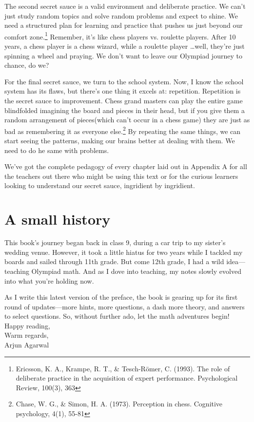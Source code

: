 The second secret sauce is a valid environment and deliberate practice. We can't just study random topics and solve random problems and expect to shine. 
We need a structured plan for learning and practice that pushes us just beyond our comfort zone.\footnote{Ericsson, K. A., Krampe, R. T., \& Tesch-Römer, C. (1993). The role of deliberate practice in the acquisition of expert performance. Psychological Review, 100(3), 363} Remember, it's like chess players vs. roulette players. 
After 10 years, a chess player is a chess wizard, while a roulette player \ldots well, they're just spinning a wheel and praying. 
We don't want to leave our Olympiad journey to chance, do we? \par \medskip
For the final secret sauce, we turn to the school system. 
Now, I know the school system has its flaws, but there's one thing it excels at: repetition. Repetition is the secret sauce to improvement. 
Chess grand masters can play the entire game blindfolded imagining the board and pieces in their head, but if you give them a random arrangement of pieces(which can't occur in a chess game) they are just as bad as remembering it as everyone else.\footnote{Chase, W. G., \& Simon, H. A. (1973). Perception in chess. Cognitive psychology, 4(1), 55-81}
 By repeating the same things, we can start seeing the patterns, making our brains better at dealing with them. We need to do he same with problems.\par\medskip

We've got the complete pedagogy of every chapter laid out in Appendix A for all the teachers out there who might be using this text or for the curious learners looking to understand our secret sauce, ingridient by ingridient.\par

\section{A small history}
This book's journey began back in class 9, during a car trip to my sister's wedding venue. However, it took a little hiatus for two years while I tackled my boards and sailed through 11th grade. 
But come 12th grade, I had a wild idea—teaching Olympiad math. And as I dove into teaching, my notes slowly evolved into what you're holding now.\par
As I write this latest version of the preface, the book is gearing up for its first round of updates—more hints, more questions, a dash more theory, and answers to select questions.
So, without further ado, let the math adventures begin!\\ \bigskip
Happy reading,\\
Warm regards,\\
Arjun Agarwal




